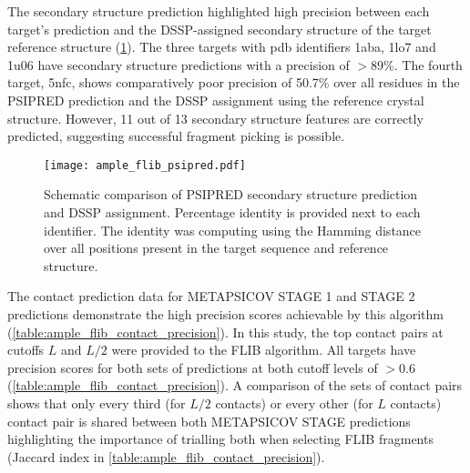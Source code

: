 The secondary structure prediction highlighted high precision between each target's prediction and the DSSP-assigned \cite{Frishman1995-si} secondary structure of the target reference structure (\cref{fig:ample_flib_psipred}). The three targets with \gls{pdb} identifiers 1aba, 1lo7 and 1u06 have secondary structure predictions with a precision of $>89$\%. The fourth target, 5nfc, shows comparatively poor precision of 50.7\% over all residues in the PSIPRED prediction and the DSSP assignment using the reference crystal structure. However, 11 out of 13 secondary structure features are correctly predicted, suggesting successful fragment picking is possible.

\begin{figure}[H]
	\centering
	\texttt{[image: ample\_flib\_psipred.pdf]}
	\caption[PSIPRED schema for FLIB targets]{Schematic comparison of PSIPRED \cite{Jones1999-ed} secondary structure prediction and DSSP \cite{Frishman1995-si} assignment. Percentage identity is provided next to each identifier. The identity was computing using the Hamming distance over all positions present in the target sequence and reference structure.}
	\label{fig:ample_flib_psipred}
\end{figure}

The contact prediction data for METAPSICOV STAGE 1 and STAGE 2 predictions demonstrate the high precision scores achievable by this algorithm (\cref{table:ample_flib_contact_precision}). In this study, the top contact pairs at cutoffs $L$ and $L/2$ were provided to the FLIB algorithm. All targets have precision scores for both sets of predictions at both cutoff levels of $>0.6$ (\cref{table:ample_flib_contact_precision}). A comparison of the sets of contact pairs shows that only every third (for $L/2$ contacts) or every other (for $L$ contacts) contact pair is shared between both METAPSICOV STAGE predictions highlighting the importance of trialling both when selecting FLIB fragments (Jaccard index in \cref{table:ample_flib_contact_precision}).


